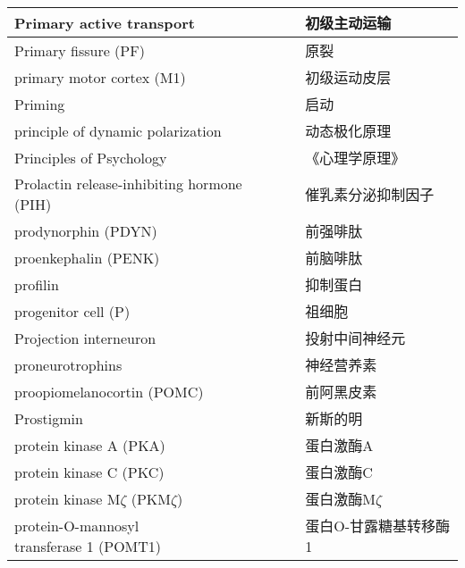 \begin{longtable}{lll}
	\midrule
	Primary active transport   && 初级主动运输  \\
	
	\midrule
	Primary fissure (PF)   && 原裂  \\
	
	\midrule
	primary motor cortex (M1)   && 初级运动皮层  \\
	
	\midrule
	Priming   && 启动  \\
	
	\midrule
	principle of dynamic polarization   && 动态极化原理  \\
	
	\midrule
	Principles of Psychology   && 《心理学原理》  \\
	
	\midrule
	Prolactin release-inhibiting hormone (PIH)  && 催乳素分泌抑制因子  \\
	
	\midrule
	prodynorphin (PDYN)  && 前强啡肽  \\
	
	\midrule
	proenkephalin (PENK)  && 前脑啡肽  \\
	
	\midrule
	profilin  && 抑制蛋白  \\
	
	\midrule
	progenitor cell (P)   && 祖细胞  \\
	
	\midrule
	Projection interneuron   && 投射中间神经元  \\
	
	\midrule
	proneurotrophins   && 神经营养素  \\
	
	\midrule
	proopiomelanocortin (POMC)  && 前阿黑皮素  \\
	
	\midrule
	Prostigmin   && 新斯的明  \\
	
	\midrule
	protein kinase A (PKA)   && 蛋白激酶A  \\
	
	\midrule
	protein kinase C (PKC)   && 蛋白激酶C  \\
	
	\midrule
	protein kinase M$\zeta$ (PKM$\zeta$)   && 蛋白激酶M$\zeta$  \\
	
	\midrule
	\makecell[l]{protein-O-mannosyl \\ transferase 1 (POMT1)}     && 蛋白O-甘露糖基转移酶1   \\
	

\end{longtable}
